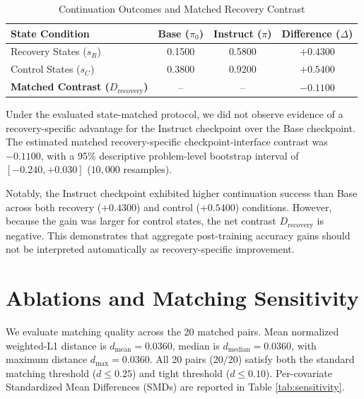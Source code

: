 \documentclass[10pt,conference]{IEEEtran}
\begin{document}
\begin{table}[htbp]
\caption{Continuation Outcomes and Matched Recovery Contrast}
\label{tab:outcomes}
\centering
\begin{tabular}{lccc}
\toprule
\textbf{State Condition} & \textbf{Base ($\pi_0$)} & \textbf{Instruct ($\pi$)} & \textbf{Difference ($\Delta$)} \\
\midrule
Recovery States ($s_R$) & 0.1500 & 0.5800 & $+0.4300$ \\
Control States ($s_C$) & 0.3800 & 0.9200 & $+0.5400$ \\
\midrule
\textbf{Matched Contrast ($D_{\text{recovery}}$)} & -- & -- & \textbf{$-0.1100$} \\
\bottomrule
\end{tabular}
\end{table}

Under the evaluated state-matched protocol, we did not observe evidence of a recovery-specific advantage for the Instruct checkpoint over the Base checkpoint. The estimated matched recovery-specific checkpoint-interface contrast was $-0.1100$, with a 95\% descriptive problem-level bootstrap interval of $[-0.240, +0.030]$ ($10,000$ resamples).

Notably, the Instruct checkpoint exhibited higher continuation success than Base across both recovery ($+0.4300$) and control ($+0.5400$) conditions. However, because the gain was larger for control states, the net contrast $D_{\text{recovery}}$ is negative. This demonstrates that aggregate post-training accuracy gains should not be interpreted automatically as recovery-specific improvement.

\section{Ablations and Matching Sensitivity}
We evaluate matching quality across the 20 matched pairs. Mean normalized weighted-L1 distance is $d_{\text{mean}} = 0.0360$, median is $d_{\text{median}} = 0.0360$, with maximum distance $d_{\max} = 0.0360$. All 20 pairs (20/20) satisfy both the standard matching threshold ($d \le 0.25$) and tight threshold ($d \le 0.10$). Per-covariate Standardized Mean Differences (SMDs) are reported in Table \ref{tab:sensitivity}.
\end{document}
